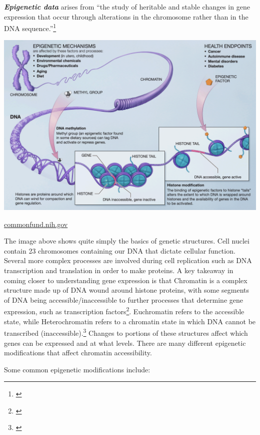 \documentclass[
]{book}
\begin{document}
\textbf{\emph{Epigenetic data}} arises from ``the study of heritable and stable changes in gene expression that occur through alterations in the chromosome rather than in the DNA sequence.''\footnote{\citet{nora2023}}

\includegraphics{images/Epigenetic_Mechanisms.png}

\href{https://commonfund.nih.gov/sites/default/files/epigeneticmechanisms.pdf}{commonfund.nih.gov}

The image above shows quite simply the basics of genetic structures. Cell nuclei contain 23 chromosomes containing our DNA that dictate cellular function. Several more complex processes are involved during cell replication such as DNA transcription and translation in order to make proteins. A key takeaway in coming closer to understanding gene expression is that Chromatin is a complex structure made up of DNA wound around histone proteins, with some segments of DNA being accessible/inaccessible to further processes that determine gene expression, such as transcription factors\footnote{\citet{tf2014}}. Euchromatin refers to the accessible state, while Heterochromatin refers to a chromatin state in which DNA cannot be transcribed (inaccessible).\footnote{\citet{shahid2023}} Changes to portions of these structures affect which genes can be expressed and at what levels. There are many different epigenetic modifications that affect chromatin accessibility.

Some common epigenetic modifications include:
\end{document}

